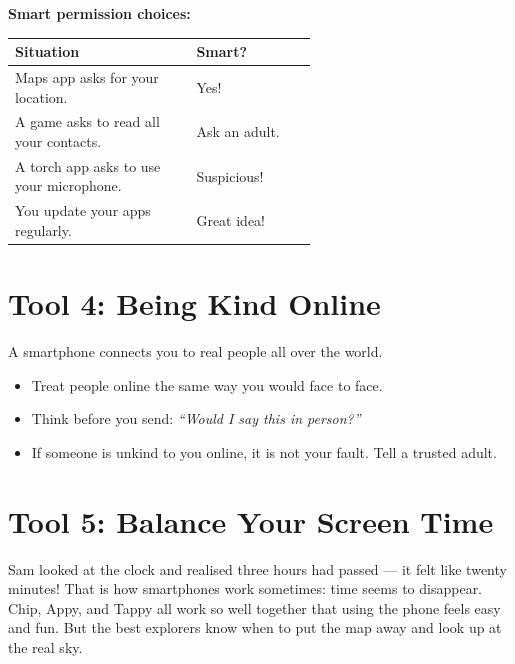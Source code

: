 \begin{quickmap}
  \textbf{Smart permission choices:}
  \begin{center}
  \begin{tabular}{p{0.6\linewidth}l}
    \textbf{Situation} & \textbf{Smart?} \\
    \hline
    Maps app asks for your location.          & Yes! \\
    A game asks to read all your contacts.    & Ask an adult. \\
    A torch app asks to use your microphone.  & Suspicious! \\
    You update your apps regularly.           & Great idea! \\
  \end{tabular}
  \end{center}
\end{quickmap}

\sectionrule

\section*{Tool 4: Being Kind Online}

A smartphone connects you to real people all over the world.
\begin{itemize}
  \item Treat people online the same way you would face to face.
  \item Think before you send: \emph{``Would I say this in person?''}
  \item If someone is unkind to you online, it is not your fault. Tell a trusted adult.
\end{itemize}


\sectionrule

\section*{Tool 5: Balance Your Screen Time}

\begin{picturethis}
  Sam looked at the clock and realised three hours had passed — it felt like twenty minutes!
  That is how smartphones work sometimes: time seems to disappear.
  Chip, Appy, and Tappy all work so well together that using the phone feels easy and fun.
  But the best explorers know when to put the map away and look up at the real sky.
\end{picturethis}

